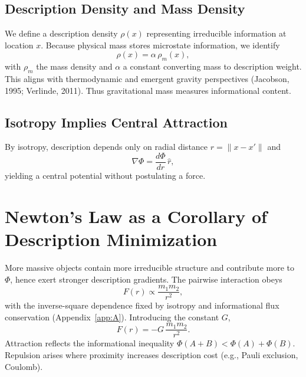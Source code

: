 \documentclass[aps,preprint,onecolumn,longbibliography,nofootinbib]{revtex4-2}
\numberwithin{equation}{section}        %
\begin{document}
\subsection{Description Density and Mass Density}
We define a description density $\rho(x)$ representing irreducible information at location $x$. Because physical mass stores microstate information, we identify
\begin{equation}
\rho(x) = \alpha\, \rho_m(x), \label{eq:rho}
\end{equation}
with $\rho_m$ the mass density and $\alpha$ a constant converting mass to description weight. This aligns with thermodynamic and emergent gravity perspectives (Jacobson, 1995; Verlinde, 2011). Thus gravitational mass measures informational content.

\subsection{Isotropy Implies Central Attraction}
By isotropy, description depends only on radial distance $r=\|x-x'\|$ and
\begin{equation}
\nabla \Phi = \frac{d\Phi}{dr}\,\hat r, \label{eq:central}
\end{equation}
yielding a central potential without postulating a force.

\section{Newton's Law as a Corollary of Description Minimization}
More massive objects contain more irreducible structure and contribute more to $\Phi$, hence exert stronger description gradients. The pairwise interaction obeys
\begin{equation}
F(r) \propto \frac{m_1 m_2}{r^2}, \label{eq:invSq}
\end{equation}
with the inverse-square dependence fixed by isotropy and informational flux conservation (Appendix~\ref{app:A}). Introducing the constant $G$,
\begin{equation}
F(r) = -G\,\frac{m_1 m_2}{r^2}. \label{eq:newton}
\end{equation}
Attraction reflects the informational inequality $\Phi(A{+}B) < \Phi(A)+\Phi(B)$. Repulsion arises where proximity increases description cost (e.g., Pauli exclusion, Coulomb).

\end{document}
